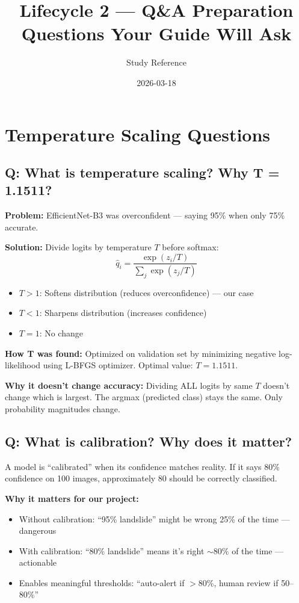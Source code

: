 \documentclass[11pt]{article}
\title{Lifecycle 2 --- Q\&A Preparation \\ \large Questions Your Guide Will Ask}
\author{Study Reference}
\date{2026-03-18}
\begin{document}
\maketitle

\tableofcontents
\newpage

\section{Temperature Scaling Questions}

\subsection{Q: What is temperature scaling? Why T = 1.1511?}

\textbf{Problem:} EfficientNet-B3 was overconfident --- saying 95\% when only 75\% accurate.

\textbf{Solution:} Divide logits by temperature $T$ before softmax:
\[
\hat{q}_i = \frac{\exp(z_i / T)}{\sum_j \exp(z_j / T)}
\]

\begin{itemize}[noitemsep]
    \item $T > 1$: Softens distribution (reduces overconfidence) --- our case
    \item $T < 1$: Sharpens distribution (increases confidence)
    \item $T = 1$: No change
\end{itemize}

\textbf{How T was found:} Optimized on validation set by minimizing negative log-likelihood using L-BFGS optimizer. Optimal value: $T = 1.1511$.

\textbf{Why it doesn't change accuracy:} Dividing ALL logits by same $T$ doesn't change which is largest. The argmax (predicted class) stays the same. Only probability magnitudes change.

\subsection{Q: What is calibration? Why does it matter?}

A model is ``calibrated'' when its confidence matches reality. If it says 80\% confidence on 100 images, approximately 80 should be correctly classified.

\textbf{Why it matters for our project:}
\begin{itemize}[noitemsep]
    \item Without calibration: ``95\% landslide'' might be wrong 25\% of the time --- dangerous
    \item With calibration: ``80\% landslide'' means it's right $\sim$80\% of the time --- actionable
    \item Enables meaningful thresholds: ``auto-alert if $>$80\%, human review if 50--80\%''
\end{itemize}
\end{document}
